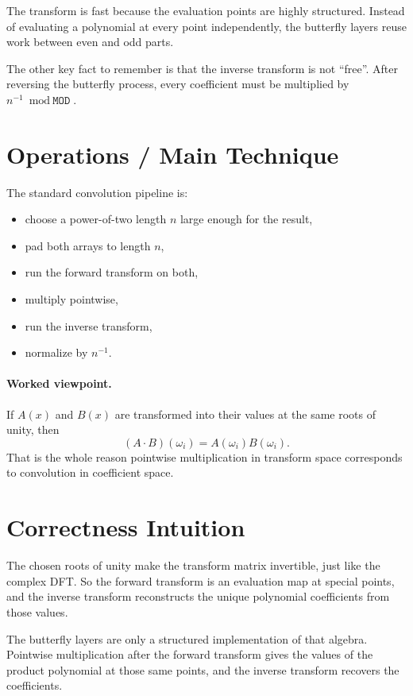 The transform is fast because the evaluation points are highly structured. Instead of evaluating a polynomial at every
point independently, the butterfly layers reuse work between even and odd parts.

The other key fact to remember is that the inverse transform is not ``free''. After reversing the butterfly process,
every coefficient must be multiplied by \(n^{-1} \bmod \texttt{MOD}\).

\section*{Operations / Main Technique}

The standard convolution pipeline is:

\begin{itemize}
  \item choose a power-of-two length \(n\) large enough for the result,
  \item pad both arrays to length \(n\),
  \item run the forward transform on both,
  \item multiply pointwise,
  \item run the inverse transform,
  \item normalize by \(n^{-1}\).
\end{itemize}

\paragraph{Worked viewpoint.}
If \(A(x)\) and \(B(x)\) are transformed into their values at the same roots of unity, then
\[
(A \cdot B)(\omega_i) = A(\omega_i) B(\omega_i).
\]
That is the whole reason pointwise multiplication in transform space corresponds to convolution in coefficient space.

\section*{Correctness Intuition}

The chosen roots of unity make the transform matrix invertible, just like the complex DFT. So the forward transform is
an evaluation map at special points, and the inverse transform reconstructs the unique polynomial coefficients from
those values.

The butterfly layers are only a structured implementation of that algebra. Pointwise multiplication after the forward
transform gives the values of the product polynomial at those same points, and the inverse transform recovers the
coefficients.


